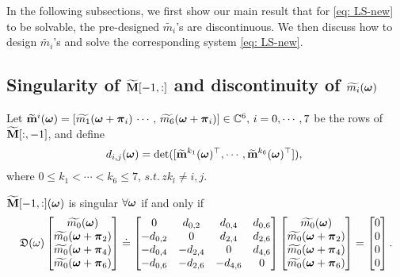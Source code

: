 In the following subsections, we first show our main result that for \eqref{eq: LS-new} to be solvable, the pre-designed $\widetilde{m_i}$'s are discontinuous. We then discuss how to design $\widetilde{m_i}$'s and solve the corresponding system \eqref{eq: LS-new}.

\subsection{Singularity of $\widetilde{\mathbf{M}}[-1,:]$ and discontinuity of $\widetilde{m_{i}}(\boldsymbol{\omega})$}

Let $\widetilde{\mathbf{m}}^{i}(\boldsymbol{\omega}) = [\widetilde{m_1}(\boldsymbol{\omega}+\boldsymbol{\pi}_i)\, \cdots,\,\widetilde{m_6}(\boldsymbol{\omega}+\boldsymbol{\pi}_i)]\in\mathbb{C}^6,\, i = 0,\cdots,7$ be the rows of $\widetilde{\mathbf{M}}[:,-1]$, and define $$d_{i,j}(\boldsymbol{\omega}) = \det([\widetilde{\mathbf{m}}^{k_1}(\boldsymbol{\omega})^\top,\cdots,\widetilde{\mathbf{m}}^{k_6}(\boldsymbol{\omega})^\top]),\;$$ where $0\leq k_1<\cdots<k_6\leq 7,\, s.t.\,z k_l\neq i,j.$
\begin{lemma}\label{lem: subM-singular-sys}
$\widetilde{\mathbf{M}}[-1,:](\boldsymbol{\omega})$ is singular $\forall \boldsymbol{\omega}$ if and only if \vspace{.5em}
\begin{align}
\label{eq: singular-cond}
\mathfrak{D}(\omega)\begin{bmatrix}
\widetilde{m_{0}}(\boldsymbol{\omega})\\
\widetilde{m_{0}}(\boldsymbol{\omega}+\boldsymbol{\pi}_{2})\\
\widetilde{m_{0}}(\boldsymbol{\omega}+\boldsymbol{\pi}_{4})\\
\widetilde{m_{0}}(\boldsymbol{\omega}+\boldsymbol{\pi}_{6})
\end{bmatrix}
\doteq
\begin{bmatrix}
0 & d_{0,2} & d_{0,4} & d_{0,6}\\
-d_{0,2} & 0 & d_{2,4} & d_{2,6}\\
-d_{0,4} & -d_{2,4} & 0 & d_{4,6}\\
-d_{0,6} & -d_{2,6} & -d_{4,6} & 0
\end{bmatrix}
\begin{bmatrix}
\widetilde{m_{0}}(\boldsymbol{\omega})\\
\widetilde{m_{0}}(\boldsymbol{\omega}+\boldsymbol{\pi}_{2})\\
\widetilde{m_{0}}(\boldsymbol{\omega}+\boldsymbol{\pi}_{4})\\
\widetilde{m_{0}}(\boldsymbol{\omega}+\boldsymbol{\pi}_{6})
\end{bmatrix}
= \begin{bmatrix}
0\\0\\0\\0
\end{bmatrix}.
\end{align}
\end{lemma}
